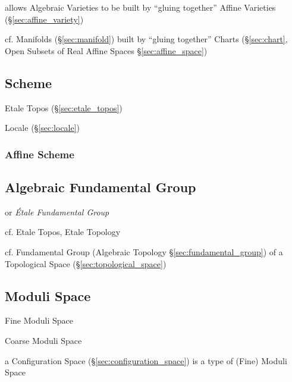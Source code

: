 allows Algebraic Varieties to be built by ``gluing together'' Affine Varieties
 (\S\ref{sec:affine_variety})

cf. Manifolds (\S\ref{sec:manifold}) built by ``gluing together'' Charts
(\S\ref{sec:chart}, Open Subsets of Real Affine Spaces
\S\ref{sec:affine_space})



\subsection{Scheme}\label{sec:scheme}

Etale Topos (\S\ref{sec:etale_topos})

Locale (\S\ref{sec:locale})



\subsubsection{Affine Scheme}\label{sec:affine_scheme}



\subsection{Algebraic Fundamental Group}\label{sec:algebraic_fundamental_group}

or \emph{\'Etale Fundamental Group}

cf. Etale Topos, Etale Topology

cf. Fundamental Group (Algebraic Topology \S\ref{sec:fundamental_group}) of a
Topological Space (\S\ref{sec:topological_space})



\subsection{Moduli Space}\label{sec:moduli_space}

Fine Moduli Space

Coarse Moduli Space

a Configuration Space (\S\ref{sec:configuration_space}) is a type of (Fine)
Moduli Space



